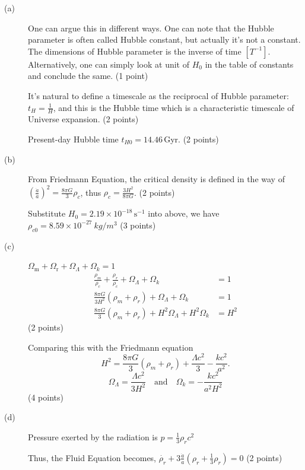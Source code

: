\begin{description}
\item[(a)] One can argue this in different ways. One can note that the
  Hubble parameter is often called Hubble constant, but actually it's not a
  constant. The dimensions of Hubble parameter is the inverse of time
  $[T^{-1}]$. Alternatively, one can simply look at unit of $H_0$ in the
  table of constants and conclude the same. \hfill(1 point)

  It's natural to define a timescale as the reciprocal of Hubble
  parameter: $t_H = \frac{1}{H}$, and this is the Hubble time which is a
  characteristic timescale of Universe expansion. \hfill(2 points)

  Present-day Hubble time $t_{H0} = 14.46$\,Gyr. \hfill(2 points)

\item[(b)] From Friedmann Equation, the critical density is defined in the
  way of
  $\left(\frac{\dot{a}}{a}\right)^2 = \frac{8\pi G}{3}\rho_c$, thus
  $\rho_c = \frac{3H^2}{8\pi G}$. \hfill(2 points)

  Substitute $H_0 = 2.19\times 10^{-18}\,\mathrm{s^{-1}}$ into above, we
  have $\rho_{c0} = 8.59\times 10^{-27}\ kg/m^3$ \hfill(3 points)

\item[(c)] $\Omega_{\mathrm{m}} + \Omega_{\mathrm{r}} + \Omega_\Lambda
  + \Omega_k = 1$
  \begin{align*}
  \frac{\rho_m}{\rho_c} + \frac{\rho_r}{\rho_c}
    + \Omega_\Lambda + \Omega_k &= 1\\
  \frac{8\pi G}{3H^2}(\rho_m + \rho_r)
    + \Omega_\Lambda + \Omega_k &= 1\\
  \frac{8\pi G}{3}(\rho_m + \rho_r)
    + H^2\Omega_\Lambda + H^2\Omega_k &= H^2
  \end{align*}
  \hfill(2 points)

  Comparing this with the Friedmann equation
  \[ H^2 = \frac{8\pi G}{3}(\rho_m + \rho_r)
     + \frac{\Lambda c^2}{3} - \frac{kc^2}{a^2}. \]
  \[ \Omega_\Lambda = \frac{\Lambda c^2}{3H^2}
     \quad\text{and}\quad
     \Omega_k = -\frac{kc^2}{a^2 H^2} \]
  \hfill(4 points)

\item[(d)] Pressure exerted by the radiation is
  $p = \frac{1}{3}\rho_r c^2$

  Thus, the Fluid Equation becomes,
  $\dot{\rho_r} + 3\frac{\dot{a}}{a}
   \left(\rho_r + \frac{1}{3}\rho_r\right) = 0$ \hfill(2 points)


\end{description}
